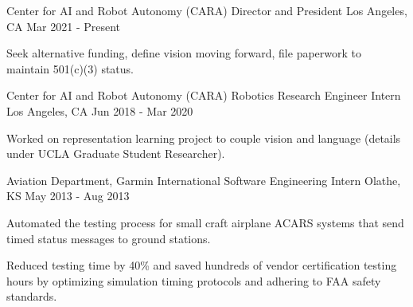 


\begin{cventries}

\cventry
{Center for AI and Robot Autonomy (CARA)}
{Director and President}
{Los Angeles, CA}
{Mar 2021 - Present}
{
\begin{cvitems}
\item Seek alternative funding, define vision moving forward, file paperwork to maintain 501(c)(3) status.
\end{cvitems}
}

\cventry
{Center for AI and Robot Autonomy (CARA)}
{Robotics Research Engineer Intern}
{Los Angeles, CA}
{Jun 2018 - Mar 2020}
{
\begin{cvitems}
\item Worked on representation learning project to couple vision and language (details under UCLA Graduate Student Researcher).
\end{cvitems}
}

\cventry
{Aviation Department, Garmin International}
{Software Engineering Intern}
{Olathe, KS}
{May 2013 - Aug 2013}
{
\begin{cvitems}
\item Automated the testing process for small craft airplane ACARS systems that send timed status messages to ground stations.
\item Reduced testing time by 40\% and saved hundreds of vendor certification testing hours by optimizing simulation timing protocols and adhering to FAA safety standards.
\end{cvitems}
}

\end{cventries}